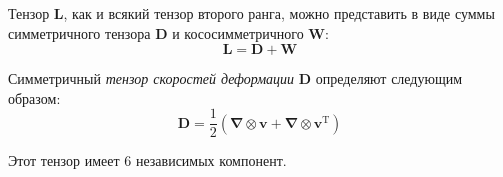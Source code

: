 
Тензор $\mathbf{L}$, как и всякий тензор второго ранга, можно представить в виде суммы симметричного тензора $\mathbf{D}$ и кососимметричного $\mathbf{W}$:
\begin{equation*}
\mathbf{L}=\mathbf{D}+\mathbf{W} 
\end{equation*}

\begin{definition*}
  Симметричный \emph{тензор скоростей деформации} $\mathbf{D}$ определяют
  следующим образом:
\begin{equation*}
\mathbf{D}=\frac{1}{2}\left(\boldsymbol{\nabla} \otimes \mathbf{v}+\boldsymbol{\nabla} \otimes \mathbf{v}^{\mathrm{T}}\right) 
\end{equation*}
\end{definition*}
Этот тензор имеет 6 независимых компонент.
